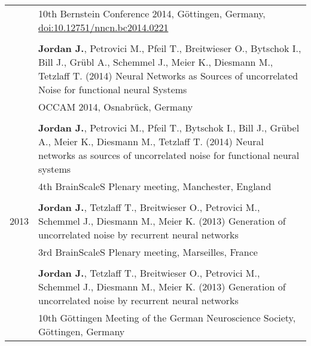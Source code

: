 \documentclass[a4paper,10pt]{article}
\begin{document}
\begin{tabular}{>{\hfill}p{1.6cm} p{}}
  & \footnotesize 10th Bernstein Conference 2014, G\"ottingen, Germany, \href{http://dx.doi.org/10.12751/nncn.bc2014.0221}{doi:10.12751/nncn.bc2014.0221} \\
  \multicolumn{2}{c}{} \\
  & \textbf{Jordan J.}, Petrovici M., Pfeil T., Breitwieser O., Bytschok I., Bill J., Gr\"ubl A., Schemmel J., Meier K., Diesmann M., Tetzlaff T. (2014) Neural Networks as Sources of uncorrelated Noise for functional neural Systems \\
  & \footnotesize OCCAM 2014, Osnabr\"uck, Germany \\
  \multicolumn{2}{c}{} \\
  & \textbf{Jordan J.}, Petrovici M., Pfeil T., Bytschok I., Bill J., Gr\"ubel A., Meier K., Diesmann M., Tetzlaff T. (2014) Neural networks as sources of uncorrelated noise for functional neural systems \\
  & \footnotesize 4th BrainScaleS Plenary meeting, Manchester, England \\
  \multicolumn{2}{c}{} \\
  2013 & \textbf{Jordan J.}, Tetzlaff T., Breitwieser O., Petrovici M., Schemmel J., Diesmann M., Meier K. (2013) Generation of uncorrelated noise by recurrent neural networks \\
  & \footnotesize 3rd BrainScaleS Plenary meeting, Marseilles, France \\
  \multicolumn{2}{c}{} \\
  & \textbf{Jordan J.}, Tetzlaff T., Breitwieser O., Petrovici M., Schemmel J., Diesmann M., Meier K. (2013) Generation of uncorrelated noise by recurrent neural networks \\
  & \footnotesize 10th G\"ottingen Meeting of the German Neuroscience Society, G\"ottingen, Germany \\
\end{tabular} \\[1em]
\end{document}
